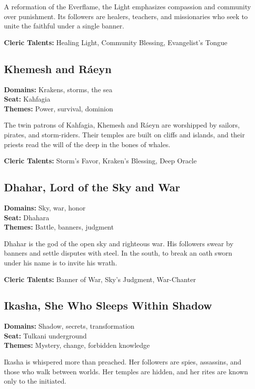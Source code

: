 A reformation of the Everflame, the Light emphasizes compassion and community over punishment. Its followers are healers, teachers, and missionaries who seek to unite the faithful under a single banner.

\textbf{Cleric Talents:} Healing Light, Community Blessing, Evangelist's Tongue

\subsection*{Khemesh and Ráeyn}

\textbf{Domains:} Krakens, storms, the sea \\
\textbf{Seat:} Kahfagia \\
\textbf{Themes:} Power, survival, dominion

The twin patrons of Kahfagia, Khemesh and Ráeyn are worshipped by sailors, pirates, and storm-riders. Their temples are built on cliffs and islands, and their priests read the will of the deep in the bones of whales.

\textbf{Cleric Talents:} Storm's Favor, Kraken's Blessing, Deep Oracle

\subsection*{Dhahar, Lord of the Sky and War}

\textbf{Domains:} Sky, war, honor \\
\textbf{Seat:} Dhahara \\
\textbf{Themes:} Battle, banners, judgment

Dhahar is the god of the open sky and righteous war. His followers swear by banners and settle disputes with steel. In the south, to break an oath sworn under his name is to invite his wrath.

\textbf{Cleric Talents:} Banner of War, Sky's Judgment, War-Chanter

\subsection*{Ikasha, She Who Sleeps Within Shadow}

\textbf{Domains:} Shadow, secrets, transformation \\
\textbf{Seat:} Tulkani underground \\
\textbf{Themes:} Mystery, change, forbidden knowledge

Ikasha is whispered more than preached. Her followers are spies, assassins, and those who walk between worlds. Her temples are hidden, and her rites are known only to the initiated.

